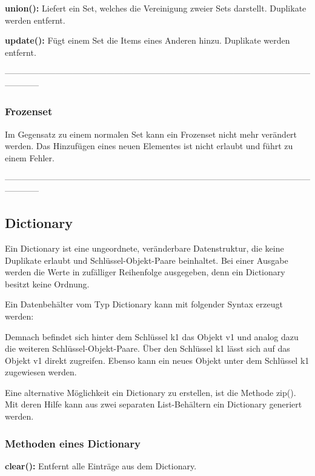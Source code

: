 \textbf{union():}
Liefert ein Set, welches die Vereinigung zweier Sets darstellt. Duplikate werden entfernt.

    
\textbf{update():}
Fügt einem Set die Items eines Anderen hinzu. Duplikate werden entfernt.

    
------------------------------------------------------------------------------------------------------------------------
\subsubsection{Frozenset}

Im Gegensatz zu einem \qlqq{}normalen\qrqq{} Set kann ein Frozenset nicht mehr verändert werden. Das Hinzufügen eines neuen Elementes ist nicht erlaubt und führt zu einem Fehler.


------------------------------------------------------------------------------------------------------------------------
\subsection{Dictionary}
Ein Dictionary ist eine ungeordnete, veränderbare Datenstruktur, die keine Duplikate erlaubt und Schlüssel-Objekt-Paare beinhaltet. Bei einer Ausgabe werden die Werte in zufälliger Reihenfolge ausgegeben, denn ein Dictionary besitzt keine Ordnung.

Ein Datenbehälter vom Typ Dictionary kann mit folgender Syntax erzeugt werden:


Demnach befindet sich hinter dem Schlüssel \glqq{}k1\grqq{} das Objekt \glqq{}v1\grqq{} und analog dazu die weiteren Schlüssel-Objekt-Paare. Über den Schlüssel  \glqq{}k1\grqq{} lässt sich auf das Objekt \glqq{}v1\grqq{} direkt zugreifen. Ebenso kann ein neues Objekt unter dem Schlüssel \glqq{}k1\grqq{} zugewiesen werden.


Eine alternative Möglichkeit ein Dictionary zu erstellen, ist die Methode zip(). Mit deren Hilfe kann aus zwei separaten List-Behältern ein Dictionary generiert werden.


\subsubsection{Methoden eines Dictionary}
\textbf{clear():}
Entfernt alle Einträge aus dem Dictionary.


